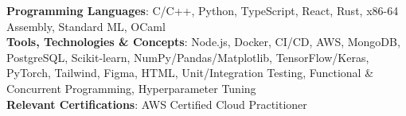 
\begin{itemize}[leftmargin=0in, label={}]
  \scriptsize{
    \item{
      \textbf{Programming Languages}{: C/C++, Python, TypeScript, React, Rust, x86-64 Assembly, Standard ML, OCaml} \\
      \textbf{Tools, Technologies \& Concepts}{: Node.js, Docker, CI/CD, AWS, MongoDB, PostgreSQL, Scikit-learn, NumPy/Pandas/Matplotlib, TensorFlow/Keras, PyTorch, Tailwind, Figma, HTML, Unit/Integration Testing, Functional \& Concurrent Programming, Hyperparameter Tuning} \\
      \textbf{Relevant Certifications}{: AWS Certified Cloud Practitioner}
      }
  }
\end{itemize}
